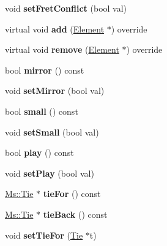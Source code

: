 \begin{DoxyCompactItemize}
void {\bfseries set\+Fret\+Conflict} (bool val)
\item 
\mbox{\label{class_ms_1_1_note_a62c2aead455c3d63ec9466b945c6fb5a}} 
virtual void {\bfseries add} (\hyperlink{class_ms_1_1_element}{Element} $\ast$) override
\item 
\mbox{\label{class_ms_1_1_note_a31dc7f8793a43c1d1e3d0a06521f5c98}} 
virtual void {\bfseries remove} (\hyperlink{class_ms_1_1_element}{Element} $\ast$) override
\item 
\mbox{\label{class_ms_1_1_note_a015e1e0a27a32eef6070e3fc45a682fe}} 
bool {\bfseries mirror} () const
\item 
\mbox{\label{class_ms_1_1_note_a0fd80339f7fe2ce2a9dedae21188821d}} 
void {\bfseries set\+Mirror} (bool val)
\item 
\mbox{\label{class_ms_1_1_note_a488c3e17de900353472040373d0e7f83}} 
bool {\bfseries small} () const
\item 
\mbox{\label{class_ms_1_1_note_abc716b0cb1c5af9ae71447f41ecb2f0c}} 
void {\bfseries set\+Small} (bool val)
\item 
\mbox{\label{class_ms_1_1_note_aa03c04b98ca671fbac3c7235c8e63d06}} 
bool {\bfseries play} () const
\item 
\mbox{\label{class_ms_1_1_note_a554a25e62121fcd063e32bbb8e50124d}} 
void {\bfseries set\+Play} (bool val)
\item 
\mbox{\label{class_ms_1_1_note_a48317b9139affa970569ed1fcb3add46}} 
\hyperlink{class_ms_1_1_tie}{Ms\+::\+Tie} $\ast$ {\bfseries tie\+For} () const
\item 
\mbox{\label{class_ms_1_1_note_a84d9574652805d8c7600ad6968ff8e40}} 
\hyperlink{class_ms_1_1_tie}{Ms\+::\+Tie} $\ast$ {\bfseries tie\+Back} () const
\item 
\mbox{\label{class_ms_1_1_note_a05ce3788d478c430ece124313a63af1f}} 
void {\bfseries set\+Tie\+For} (\hyperlink{class_ms_1_1_tie}{Tie} $\ast$t)

\end{DoxyCompactItemize}
